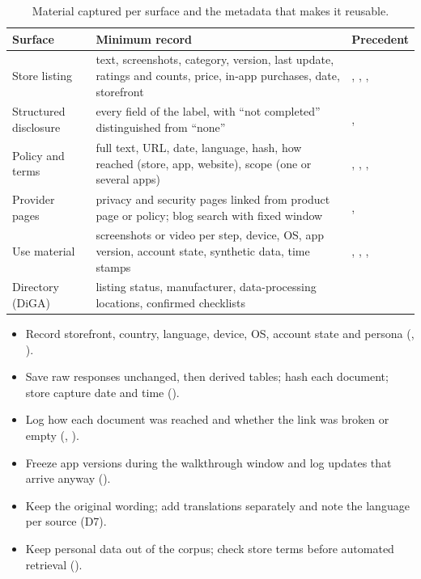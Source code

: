 \begin{table}[t]
\centering\small
\caption{Material captured per surface and the metadata that makes it reusable.}
\label{tab:D-material}
\begin{tabularx}{\textwidth}{@{}P{2.7cm}YY@{}}
\toprule
\textbf{Surface} & \textbf{Minimum record} & \textbf{Precedent}\\
\midrule
Store listing & text, screenshots, category, version, last update, ratings and counts, price, in-app purchases, date, storefront & , , , \\
Structured disclosure & every field of the label, with ``not completed'' distinguished from ``none'' & , \\
Policy and terms & full text, URL, date, language, hash, how reached (store, app, website), scope (one or several apps) & , , , \\
Provider pages & privacy and security pages linked from product page or policy; blog search with fixed window & , \\
Use material & screenshots or video per step, device, OS, app version, account state, synthetic data, time stamps & , , , \\
Directory (DiGA) & listing status, manufacturer, data-processing locations, confirmed checklists & \\
\bottomrule
\end{tabularx}
\end{table}

\begin{protocolbox}
\begin{itemize}[leftmargin=1.3em]
\item Record storefront, country, language, device, OS, account state and persona (, ).
\item Save raw responses unchanged, then derived tables; hash each document; store capture date and time ().
\item Log how each document was reached and whether the link was broken or empty (, ).
\item Freeze app versions during the walkthrough window and log updates that arrive anyway ().
\item Keep the original wording; add translations separately and note the language per source (D7).
\item Keep personal data out of the corpus; check store terms before automated retrieval ().
\end{itemize}
\end{protocolbox}

